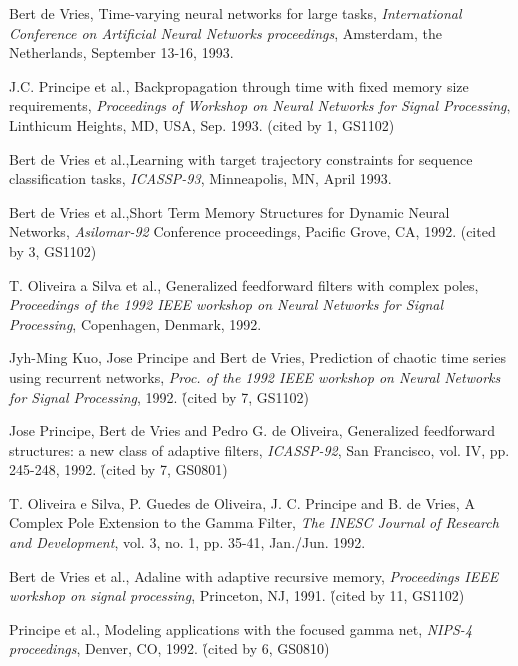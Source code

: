 \begin{etaremune}
\item Bert de Vries, Time-varying neural networks for large tasks, {\em International Conference on Artificial
Neural Networks proceedings}, Amsterdam, the Netherlands, September
13-16, 1993.

\item  J.C. Principe et al., Backpropagation through time with fixed memory size requirements, \emph{Proceedings of Workshop on Neural Networks for Signal Processing}, Linthicum Heights, MD, USA, Sep. 1993. (cited by 1, GS1102)

\item Bert de Vries et al.,Learning with target trajectory constraints for sequence classification tasks,
{\em ICASSP-93}, Minneapolis, MN, April 1993.

\item Bert de Vries et al.,Short Term Memory Structures for Dynamic Neural
Networks,  {\em Asilomar-92}
Conference proceedings, Pacific Grove, CA, 1992. (cited by 3, GS1102)

\item T. Oliveira a Silva et al., Generalized feedforward filters with
complex poles, {\em Proceedings of the
1992 IEEE workshop on Neural Networks for Signal Processing},
Copenhagen, Denmark, 1992.

\item Jyh-Ming Kuo, Jose Principe and Bert de
Vries, Prediction of chaotic time series using recurrent networks,
{\em Proc. of the 1992 IEEE workshop on Neural Networks for Signal
Processing}, 1992. \r{(cited by 7, GS1102)}

\item Jose Principe, Bert de Vries and
Pedro G. de Oliveira, Generalized feedforward structures: a new class
of adaptive filters, {\em ICASSP-92}, San Francisco, vol. IV,
pp. 245-248, 1992. \r{(cited by 7, GS0801)}

\item T. Oliveira e Silva, P. Guedes de Oliveira, J. C. Principe and B.
de Vries, A Complex Pole Extension to the Gamma Filter, {\em The
INESC Journal of Research and Development}, vol. 3, no. 1, pp.
35-41, Jan./Jun. 1992.

\item Bert de Vries et al., Adaline with adaptive recursive memory, {\em Proceedings IEEE workshop on signal
processing}, Princeton, NJ, 1991. \r{(cited by 11, GS1102)}

\item Principe et al., Modeling applications with the focused gamma
net,  {\em NIPS-4 proceedings},
Denver, CO, 1992. \r{(cited by 6, GS0810)}


\end{etaremune}
